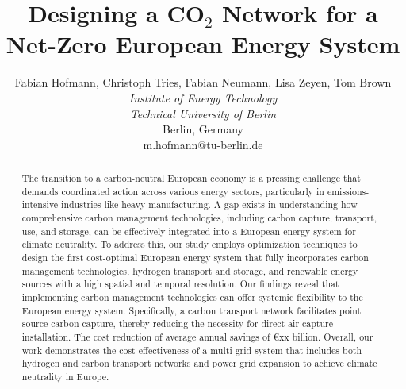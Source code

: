 \documentclass[twocolumn]{article}
\newcommand{\carbon}{CO$_2$}
\begin{document}
\title{Designing a \carbon{} Network for a Net-Zero European Energy System}

\author{
    Fabian Hofmann, Christoph Tries, Fabian Neumann, Lisa Zeyen, Tom Brown \\
    \textit{Institute of Energy Technology} \\
    \textit{Technical University of Berlin}\\
    Berlin, Germany \\
    m.hofmann@tu-berlin.de
}


\maketitle

\begin{abstract}
    The transition to a carbon-neutral European economy is a pressing challenge that demands coordinated action across various energy sectors, particularly in emissions-intensive industries like heavy manufacturing.
    A gap exists in understanding how comprehensive carbon management technologies, including carbon capture, transport, use, and storage, can be effectively integrated into a European energy system for climate neutrality.
    To address this, our study employs optimization techniques to design the first cost-optimal European energy system that fully incorporates carbon management technologies, hydrogen transport and storage, and renewable energy sources with a high spatial and temporal resolution.
    Our findings reveal that implementing carbon management technologies can offer systemic flexibility to the European energy system. Specifically, a carbon transport network facilitates point source carbon capture, thereby reducing the necessity for direct air capture installation. The cost reduction of  average annual savings of €xx billion.
    Overall, our work demonstrates the cost-effectiveness of a multi-grid system that includes both hydrogen and carbon transport networks and power grid expansion to achieve climate neutrality in Europe.




\end{abstract}
\end{document}
